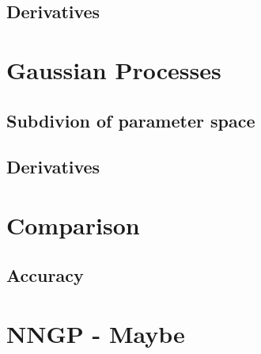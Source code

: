 		\subsection{Derivatives}
	\section{Gaussian Processes}
		\subsection{Subdivion of parameter space}
		\subsection{Derivatives}
	\section{Comparison}
		\subsection{Accuracy}
	\section{NNGP - Maybe}